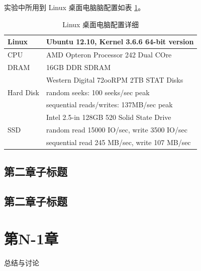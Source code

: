 \documentclass[a4paper]{article}
\begin{document}
实验中所用到 Linux 桌面电脑脑配置如表 \ref{tab:1}。
\begin{table}[!htb]
    \centering
        \begin{tabular}{|l|l|} \hline
		Linux				&		Ubuntu 12.10, Kernel 3.6.6 64-bit version \\ \hline
		CPU 				& 	AMD Opteron Processor 242 Dual COre \\ \hline
		DRAM 			& 	16GB DDR SDRAM  \\ \hline
		\multirow{3}{*}{Hard Disk}	
								& 	Western Digital 72ooRPM 2TB STAT Disks \\
								&  	random seeks: 100 seeks/sec peak \\
								& 	sequential reads/writes: 137MB/sec peak \\ \hline
		\multirow{3}{*}{SSD}				
								&  	Intel 2.5-in 128GB 520 Solid State Drive \\ 
								& 	random read 15000 IO/sec, write 3500 IO/sec \\
								& 	sequential read 245 MB/sec, write 107 MB/sec \\ \hline
	   \end{tabular}
    \caption{Linux 桌面电脑配置详细}\label{tab:1}
\end{table}

\subsection{第二章子标题}



\subsection{第二章子标题}


\section{第N-1章}

总结与讨论
\end{document}
